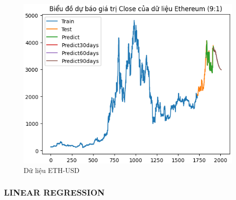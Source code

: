 \documentclass[conference]{IEEEtran}
\begin{document}
\begin{figure}[H]
\begin{minipage}{0.15\textwidth}
    \includegraphics[width=1\textwidth]{Figure/RNN_ETH91.png}
    \end{minipage}
    \caption{Dữ liệu ETH-USD}
    \label{fig:1}
\end{figure}

\subsubsection{LINEAR REGRESSION}
\end{document}
